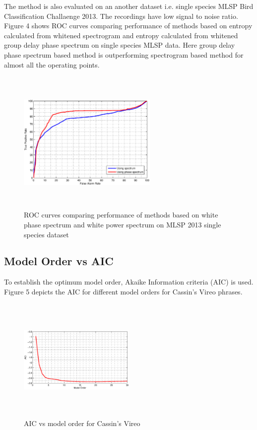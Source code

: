 \documentclass[a4paper]{article}
\begin{document}
 
 
 
The method is also evaluated on an another dataset i.e. single species MLSP Bird Classification Challaenge 2013. The recordings have low signal to noise ratio.  Figure 4 shows ROC curves comparing performance of methods based on entropy calculated from whitened spectrogram and entropy calculated from whitened group delay phase spectrum on single species MLSP data. Here group delay phase spectrum based method is outperforming spectrogram based method for almost all the operating points. 

 
\begin{figure}[!ht]
	\centering
	\includegraphics[width=0.6\textwidth,height=7cm] {ROC_gr_delay__VS_spectrogram_data2.eps}
	\caption{ROC curves comparing performance of methods based on white phase spectrum and white power spectrum on MLSP 2013 single species dataset }   
\end{figure} 

 \subsection{Model Order  vs AIC}
 
 
 To establish the optimum model order, Akaike Information criteria (AIC)  \cite{makhoul} is used. Figure 5 depicts the AIC for different model orders for Cassin's Vireo phrases.  
 
 
 \begin{figure}[!ht]
	\centering
	\includegraphics[width=0.5\textwidth,height=6cm] {cassin_aic.eps}
	\caption{AIC vs model order for Cassin's Vireo }   
\end{figure} 
\end{document}
